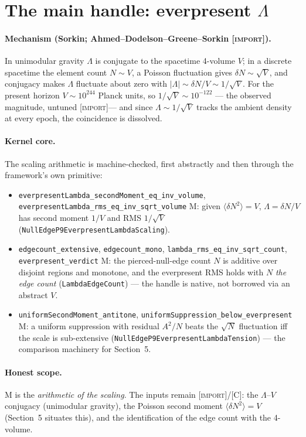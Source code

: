 \documentclass[11pt]{article}
\newcommand{\Lam}{\Lambda}
\newcommand{\Kernel}{\textcolor{kcol}{\textsc{M}}}       %
\newcommand{\Import}{\textcolor{icol}{\textsc{[import]}}} %
\newcommand{\Conj}{\textcolor{ccol}{\textsc{[C]}}}        %
\newcommand{\lm}[1]{\texttt{#1}}
\begin{document}
\section{The main handle: everpresent $\Lam$}

\paragraph{Mechanism (Sorkin; Ahmed--Dodelson--Greene--Sorkin \Import).}
In unimodular gravity $\Lam$ is conjugate to the spacetime 4-volume $V$; in a
discrete spacetime the element count $N\sim V$, a Poisson fluctuation gives
$\delta N\sim\sqrt V$, and conjugacy makes $\Lam$ fluctuate about zero with
$|\Lam|\sim\delta N/V\sim1/\sqrt V$.  For the present horizon $V\sim10^{244}$
Planck units, so $1/\sqrt V\sim10^{-122}$ --- the observed magnitude, untuned
\Import --- and since $\Lam\sim1/\sqrt V$ tracks the ambient density at every
epoch, the coincidence is dissolved.

\paragraph{Kernel core.}  The scaling arithmetic is machine-checked, first
abstractly and then through the framework's own primitive:
\begin{itemize}[leftmargin=1.6em,itemsep=1pt]
\item \lm{everpresentLambda\_secondMoment\_eq\_inv\_volume},
  \lm{everpresentLambda\_rms\_eq\_inv\_sqrt\_volume} \Kernel{}: given
  $\langle\delta N^2\rangle = V$, $\Lam=\delta N/V$ has second moment $1/V$ and
  RMS $1/\sqrt V$ (\lm{NullEdgeP9EverpresentLambdaScaling}).
\item \lm{edgecount\_extensive}, \lm{edgecount\_mono},
  \lm{lambda\_rms\_eq\_inv\_sqrt\_count}, \lm{everpresent\_verdict} \Kernel{}:
  the pierced-null-edge count $N$ is additive over disjoint regions and
  monotone, and the everpresent RMS holds with $N$ \emph{the edge count}
  (\lm{LambdaEdgeCount}) --- the handle is native, not borrowed via an abstract
  $V$.
\item \lm{uniformSecondMoment\_antitone},
  \lm{uniformSuppression\_below\_everpresent} \Kernel{}: a uniform suppression
  with residual $A^2/N$ beats the $\sqrt N$ fluctuation iff the scale is
  sub-extensive (\lm{NullEdgeP9EverpresentLambdaTension}) --- the comparison
  machinery for Section~5.
\end{itemize}

\paragraph{Honest scope.}  \Kernel{} is the \emph{arithmetic of the scaling}.
The inputs remain \Import/\Conj: the $\Lam$--$V$ conjugacy (unimodular gravity),
the Poisson second moment $\langle\delta N^2\rangle=V$ (Section~5 situates this),
and the identification of the edge count with the 4-volume.
\end{document}
